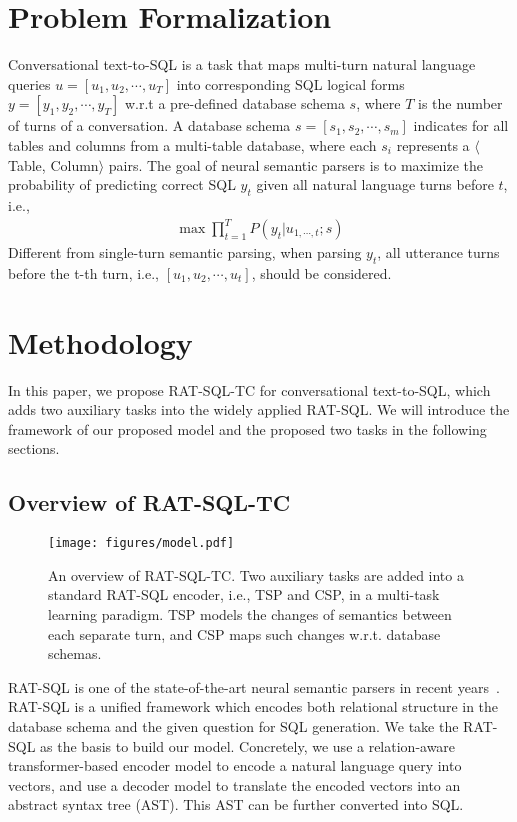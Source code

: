 \documentclass[a4paper]{article}
\begin{document}
\section{Problem Formalization}

Conversational text-to-SQL is a task that maps multi-turn natural language queries $u = [u_1, u_2, \cdots, u_T]$ into corresponding SQL logical forms $y=[y_1, y_2, \cdots, y_T]$ w.r.t a pre-defined database schema $s$, where $T$ is the number of turns of a conversation. A database schema $s=[s_1, s_2, \cdots, s_m]$ indicates for all tables and columns from a multi-table database, where each $s_i$ represents a $\langle$Table, Column$\rangle$ pairs. The goal of neural semantic parsers is to maximize the probability of predicting correct SQL $y_t$ given all natural language turns before $t$, i.e.,
\begin{equation}
    \begin{aligned}
    \max \prod_{t=1}^{T} P(y_t | u_{1, \cdots, t};s)
    \end{aligned}
\end{equation}Different from single-turn semantic parsing, when parsing $y_t$, all utterance turns before the t-th turn, i.e., $[u_1, u_2, \cdots, u_t]$, should be considered.

\section{Methodology}

In this paper, we propose RAT-SQL-TC for conversational text-to-SQL, which adds two auxiliary tasks into the widely applied RAT-SQL. We will introduce the framework of our proposed model and the proposed two tasks in the following sections.

\subsection{Overview of RAT-SQL-TC}

\begin{figure*}[htbp]
    \centering
    \texttt{[image: figures/model.pdf]}
    \caption{An overview of RAT-SQL-TC. Two auxiliary tasks are added into a standard RAT-SQL encoder, i.e., TSP and CSP, in a multi-task learning paradigm. TSP models the changes of semantics between each separate turn, and CSP maps such changes w.r.t. database schemas.}
    \label{fig:model}
\end{figure*}

RAT-SQL is one of the state-of-the-art neural semantic parsers in recent years~\cite{wang2019rat}. RAT-SQL is a unified framework which encodes both relational structure in the database schema and the given question for SQL generation. We take the RAT-SQL as the basis to build our model. Concretely, we use a relation-aware transformer-based encoder model to encode a natural language query into vectors, and use a decoder model to translate the encoded vectors into an abstract syntax tree (AST). This AST can be further converted into SQL.
\end{document}
